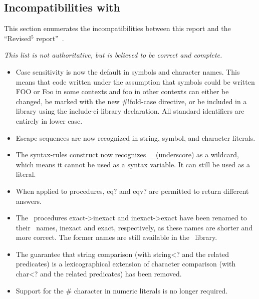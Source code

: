 

\subsection*{Incompatibilities with \rfivers}
\label{incompatibilities}

This section enumerates the incompatibilities between this report and
the ``Revised$^5$ report''~\cite{R5RS}.

{\em This list is not authoritative, but is believed to be correct and complete.}


\begin{itemize}

\item Case sensitivity is now the default in symbols and character names.
This means that code written under the assumption that symbols could be
written {\cf FOO} or {\cf Foo} in some contexts and {\cf foo} in other contexts
can either be changed, be marked with the new {\cf \#!fold-case} directive,
or be included in a library using the {\cf include-ci} library declaration.
All standard identifiers are entirely in lower case.

\item Escape sequences are now recognized in string, symbol, and character
literals.

\item The {\cf syntax-rules} construct now recognizes {\em \_} (underscore) 
as a wildcard, which means it cannot be used as a syntax variable.
It can still be used as a literal.

\item When applied to procedures, {\cf eq?} and {\cf eqv?} are permitted to
return different answers.

\item The \rfivers\ procedures {\cf exact->inexact} and {\cf inexact->exact}
have been renamed to their \rsixrs\ names, {\cf inexact} and {\cf exact},
respectively, as these names are shorter and more correct.
The former names are still available in the \rfivers\ library.

\item The guarantee that string comparison (with {\cf string<?} and the
related predicates) is a lexicographical extension of character comparison
(with {\cf char<?} and the related predicates) has been removed.  

\item Support for the \# character in numeric literals is no longer required.


\end{itemize}
